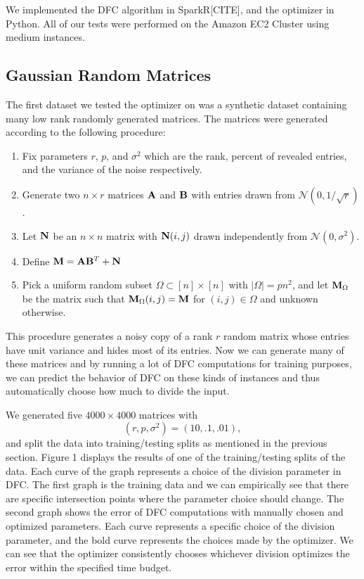 We implemented the DFC algorithm in SparkR[CITE], and the optimizer in Python. All of our tests were performed on the Amazon EC2 Cluster using medium instances. 

\subsection{Gaussian Random Matrices}
The first dataset we tested the optimizer on was a synthetic dataset containing many low rank randomly generated matrices. The matrices were generated according to the following procedure: 
\begin{enumerate}
\item Fix parameters $r$, $p$, and $\sigma^2$ which are the rank, percent of revealed entries, and the variance of the noise respectively.
\item Generate two $n \times r$ matrices ${\bf A}$ and ${\bf B}$ with entries drawn from $\mathcal{N}(0,1/\sqrt{r})$. 
\item Let ${\bf N}$ be an $n \times n$ matrix with ${\bf N}(i,j)$ drawn independently from $\mathcal{N}(0,\sigma^2)$. 
\item Define ${\bf M} = {\bf A}{\bf B}^T + {\bf N}$
\item Pick a uniform random subset $\Omega \subset [n] \times [n]$ with $|\Omega| = pn^2$, and let ${\bf M}_{\Omega}$ be the matrix such that ${\bf M}_{\Omega}(i,j) = {\bf M}$ for $(i,j) \in \Omega$ and unknown otherwise. 
\end{enumerate}
This procedure generates a noisy copy of a rank $r$ random matrix whose entries have unit variance and hides most of its entries. Now we can generate many of these matrices and by running a lot of DFC computations for training purposes, we can predict the behavior of DFC on these kinds of instances and thus automatically choose how much to divide the input. 

We generated five $4000 \times 4000$ matrices with 
\[(r,p,\sigma^2) = (10,.1,.01),\] 
and split the data into training/testing splits as mentioned in the previous section. Figure 1 displays the results of one of the training/testing splits of the data. Each curve of the graph represents a choice of the division parameter in DFC. The first graph is the training data and we can empirically see that there are specific intersection points where the parameter choice should change. The second graph shows the error of DFC computations with manually chosen and optimized parameters. Each curve represents a specific choice of the division parameter, and the bold curve represents the choices made by the optimizer. We can see that the optimizer consistently chooses whichever division optimizes the error within the specified time budget. 

